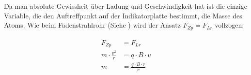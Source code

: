 Da man absolute Gewissheit über Ladung und Geschwindigkeit hat ist die einzige Variable, die den Auftreffpunkt auf der Indikatorplatte bestimmt, die Masse des Atoms. Wie beim Fadenstrahlrohr (Siehe ) wird der Ansatz $F_{Zp} = F_{Lr}$ vollzogen:

\begin{align}
\begin{split}
	F_{Zp} 				  &= F_{Lr} \\
	m \cdot \frac{v^2}{r} &= q \cdot B \cdot v \\
	m 					  &= \frac{q \cdot B \cdot r}{v}
\end{split}
\end{align}










